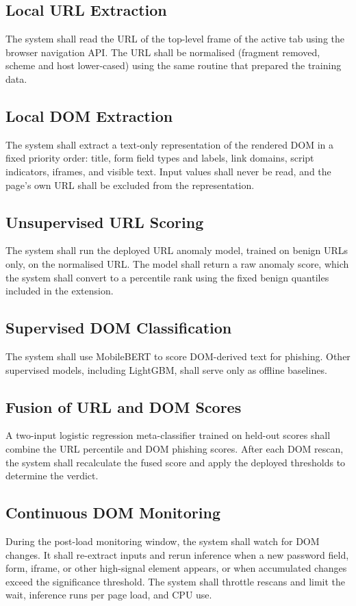 \documentclass{FastFyp}
\begin{document}
\subsection{Local URL Extraction}
The system shall read the URL of the top-level frame of the active tab using the browser navigation API. The URL shall be normalised (fragment removed, scheme and host lower-cased) using the same routine that prepared the training data.

\subsection{Local DOM Extraction}
The system shall extract a text-only representation of the rendered DOM in a fixed priority order: title, form field types and labels, link domains, script indicators, iframes, and visible text. Input values shall never be read, and the page's own URL shall be excluded from the representation.

\subsection{Unsupervised URL Scoring}
The system shall run the deployed URL anomaly model, trained on benign URLs only, on the normalised URL. The model shall return a raw anomaly score, which the system shall convert to a percentile rank using the fixed benign quantiles included in the extension.

\subsection{Supervised DOM Classification}
The system shall use MobileBERT to score DOM-derived text for phishing. Other supervised models, including LightGBM, shall serve only as offline baselines.

\subsection{Fusion of URL and DOM Scores}
A two-input logistic regression meta-classifier trained on held-out scores shall combine the URL percentile and DOM phishing scores. After each DOM rescan, the system shall recalculate the fused score and apply the deployed thresholds to determine the verdict.

\subsection{Continuous DOM Monitoring}
During the post-load monitoring window, the system shall watch for DOM changes. It shall re-extract inputs and rerun inference when a new password field, form, iframe, or other high-signal element appears, or when accumulated changes exceed the significance threshold. The system shall throttle rescans and limit the wait, inference runs per page load, and CPU use.
\end{document}
